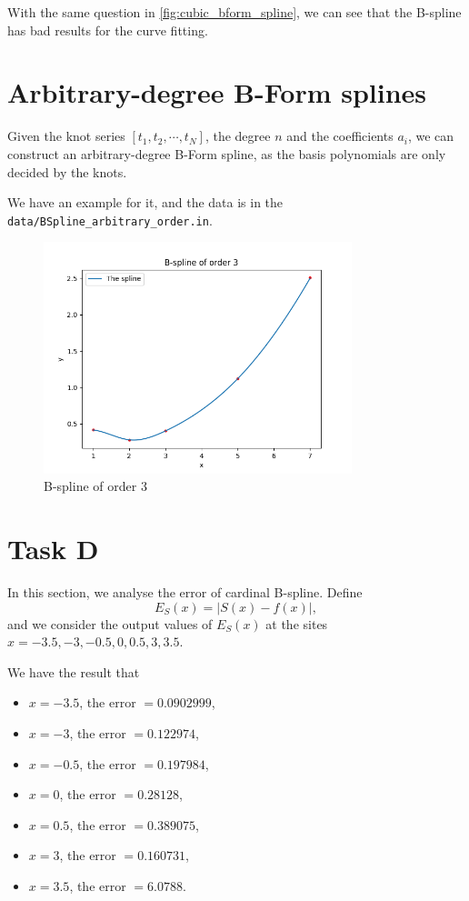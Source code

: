 \documentclass[a4paper]{article}
\begin{document}
With the same question in \cref{fig:cubic_bform_spline}, we can see that the B-spline has bad results for the curve fitting.

\section{Arbitrary-degree B-Form splines}

Given the knot series $[t_1, t_2, \cdots, t_N]$, the degree $n$ and the coefficients $a_i$, we can construct an arbitrary-degree B-Form spline, as the basis polynomials are only decided by the knots.

We have an example for it, and the data is in the \verb|data/BSpline_arbitrary_order.in|.

\begin{figure}[htbp]
  \centering
  \includegraphics[width = 0.8\textwidth]{../figure/B-spline of order 3.png}
  \caption{B-spline of order 3}
\end{figure}

\section{Task D}

In this section, we analyse the error of cardinal B-spline. Define
\begin{equation}
	E_S(x) = |S(x) - f(x)|,
	\label{eq:error}
\end{equation}
and we consider the output values of $E_S(x)$ at the sites $x = -3.5, -3, -0.5, 0, 0.5, 3, 3.5$.

We have the result that
\begin{itemize}
	\item $x = -3.5$, the error $= 0.0902999$,
	\item $x = -3$, the error $= 0.122974$,
	\item $x = -0.5$, the error $= 0.197984$,
	\item $x = 0$, the error $= 0.28128$,
	\item $x = 0.5$, the error $= 0.389075$,
	\item $x = 3$, the error $= 0.160731$,
	\item $x = 3.5$, the error $= 6.0788$.
\end{itemize}
\end{document}
